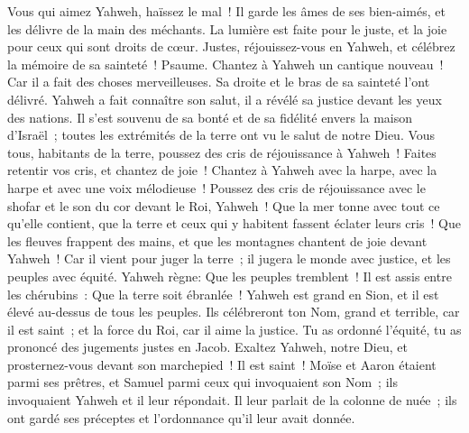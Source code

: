 \begin{multicols}{2}
Vous qui aimez Yahweh, haïssez le mal~! Il garde les âmes de ses bien-aimés, et les délivre de la main des méchants.
La lumière est faite pour le juste, et la joie pour ceux qui sont droits de cœur.
Justes, réjouissez-vous en Yahweh, et célébrez la mémoire de sa sainteté~!
\VerseOne{}Psaume. Chantez à Yahweh un cantique nouveau~! Car il a fait des choses merveilleuses. Sa droite et le bras de sa sainteté l'ont délivré.
Yahweh a fait connaître son salut, il a révélé sa justice devant les yeux des nations.
Il s'est souvenu de sa bonté et de sa fidélité envers la maison d'Israël~; toutes les extrémités de la terre ont vu le salut de notre Dieu.
Vous tous, habitants de la terre, poussez des cris de réjouissance à Yahweh~! Faites retentir vos cris, et chantez de joie~!
Chantez à Yahweh avec la harpe, avec la harpe et avec une voix mélodieuse~!
Poussez des cris de réjouissance avec le shofar et le son du cor devant le Roi, Yahweh~!
Que la mer tonne avec tout ce qu'elle contient, que la terre et ceux qui y habitent fassent éclater leurs cris~!
Que les fleuves frappent des mains, et que les montagnes chantent de joie
devant Yahweh~! Car il vient pour juger la terre~; il jugera le monde avec justice, et les peuples avec équité.
\VerseOne{}Yahweh règne: Que les peuples tremblent~! Il est assis entre les chérubins~: Que la terre soit ébranlée~!
Yahweh est grand en Sion, et il est élevé au-dessus de tous les peuples.
Ils célébreront ton Nom, grand et terrible, car il est saint~;
et la force du Roi, car il aime la justice. Tu as ordonné l'équité, tu as prononcé des jugements justes en Jacob.
Exaltez Yahweh, notre Dieu, et prosternez-vous devant son marchepied~! Il est saint~!
Moïse et Aaron étaient parmi ses prêtres, et Samuel parmi ceux qui invoquaient son Nom~; ils invoquaient Yahweh et il leur répondait.
Il leur parlait de la colonne de nuée~; ils ont gardé ses préceptes et l'ordonnance qu'il leur avait donnée.

\end{multicols}
